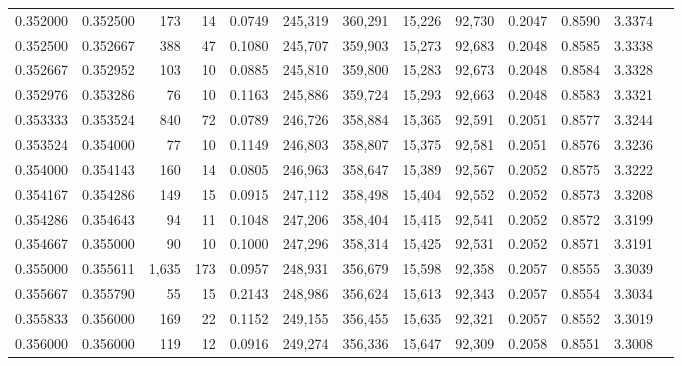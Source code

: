 \begin{tabular}{rrrrrrrrrrrrr}
0.352000 & 0.352500 &   173 &  14 &                                     0.0749 & 245,319 & 360,291 &  15,226 &  92,730 & 0.2047 & 0.8590 & 3.3374 \\
0.352500 & 0.352667 &   388 &  47 &                                     0.1080 & 245,707 & 359,903 &  15,273 &  92,683 & 0.2048 & 0.8585 & 3.3338 \\
0.352667 & 0.352952 &   103 &  10 &                                     0.0885 & 245,810 & 359,800 &  15,283 &  92,673 & 0.2048 & 0.8584 & 3.3328 \\
0.352976 & 0.353286 &    76 &  10 &                                     0.1163 & 245,886 & 359,724 &  15,293 &  92,663 & 0.2048 & 0.8583 & 3.3321 \\
0.353333 & 0.353524 &   840 &  72 &                                     0.0789 & 246,726 & 358,884 &  15,365 &  92,591 & 0.2051 & 0.8577 & 3.3244 \\
0.353524 & 0.354000 &    77 &  10 &                                     0.1149 & 246,803 & 358,807 &  15,375 &  92,581 & 0.2051 & 0.8576 & 3.3236 \\
0.354000 & 0.354143 &   160 &  14 &                                     0.0805 & 246,963 & 358,647 &  15,389 &  92,567 & 0.2052 & 0.8575 & 3.3222 \\
0.354167 & 0.354286 &   149 &  15 &                                     0.0915 & 247,112 & 358,498 &  15,404 &  92,552 & 0.2052 & 0.8573 & 3.3208 \\
0.354286 & 0.354643 &    94 &  11 &                                     0.1048 & 247,206 & 358,404 &  15,415 &  92,541 & 0.2052 & 0.8572 & 3.3199 \\
0.354667 & 0.355000 &    90 &  10 &                                     0.1000 & 247,296 & 358,314 &  15,425 &  92,531 & 0.2052 & 0.8571 & 3.3191 \\
0.355000 & 0.355611 & 1,635 & 173 &                                     0.0957 & 248,931 & 356,679 &  15,598 &  92,358 & 0.2057 & 0.8555 & 3.3039 \\
0.355667 & 0.355790 &    55 &  15 &                                     0.2143 & 248,986 & 356,624 &  15,613 &  92,343 & 0.2057 & 0.8554 & 3.3034 \\
0.355833 & 0.356000 &   169 &  22 &                                     0.1152 & 249,155 & 356,455 &  15,635 &  92,321 & 0.2057 & 0.8552 & 3.3019 \\
0.356000 & 0.356000 &   119 &  12 &                                     0.0916 & 249,274 & 356,336 &  15,647 &  92,309 & 0.2058 & 0.8551 & 3.3008 \\

\end{tabular}
